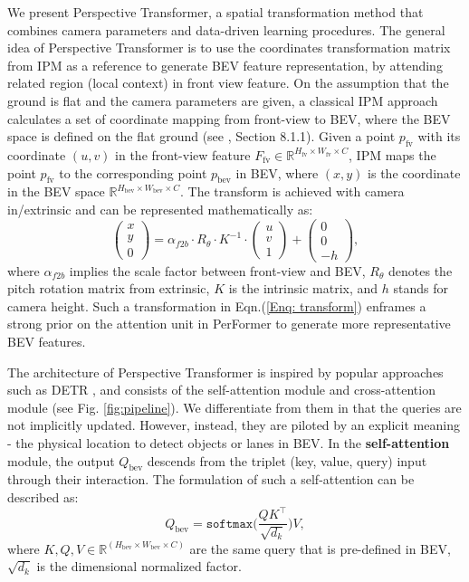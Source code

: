 \documentclass[runningheads]{llncs}
\begin{document}
We present Perspective Transformer, a spatial transformation method that combines camera parameters and data-driven learning procedures.
The general idea of Perspective Transformer is
{to use the coordinates transformation matrix from IPM as a reference to generate BEV feature representation},
by attending related region (local context) in front view feature.
On the assumption that the ground is flat and the camera 
parameters are given, a classical IPM approach calculates a set of coordinate mapping from front-view to BEV, where the BEV space is defined on the flat ground (see \cite{Hartley2004}, Section 8.1.1).
Given a point $p_{\text{fv}}$ with its coordinate $(u,v)$ in the front-view feature $F_{\text{fv}} \in \mathbb{R}^{H_{\text{fv}} \times W_{\text{fv}} \times C}$, IPM maps the point $p_{\text{fv}}$ to the corresponding point $p_{\text{bev}}$ in BEV, where $(x,y)$ is the coordinate in the BEV space $\mathbb{R}^{H_{\text{bev}} \times W_{\text{bev}} \times C}$. 
The transform is achieved with camera in/extrinsic and can be represented mathematically as:
\begin{equation}\begin{pmatrix}
    x \\
    y \\
    0
    \end{pmatrix} = \alpha_{f2b} \cdot R_{\theta} \cdot K^{-1} \cdot
    \begin{pmatrix}
    u \\
    v \\
    1
    \end{pmatrix} + 
    \begin{pmatrix}
    0 \\
    0 \\
    -h
    \end{pmatrix}, \label{Enq: transform}
\end{equation}
where $\alpha_{f2b}$ implies the scale factor between front-view and BEV, $R_{\theta}$ denotes the pitch rotation matrix from extrinsic, $K$ is the intrinsic matrix, and $h$ stands for camera height.
Such a transformation in Eqn.(\ref{Enq: transform}) enframes a strong prior 
on the attention unit in PerFormer to generate more representative BEV features.




The architecture of Perspective Transformer is inspired by popular approaches such as DETR \cite{carion2020end},  and consists of the self-attention module and cross-attention module (see Fig. \ref{fig:pipeline}).
We differentiate from them in that the queries are not implicitly updated. However, instead, they are piloted by an explicit meaning - the physical location to detect objects or lanes in BEV.
{In the \textbf{self-attention} module, the output $ Q_{\text{bev}} $ descends from the triplet (key, value, query) input through their interaction.}
The formulation of such a self-attention can be described as:
\begin{equation}
    Q_{\text{bev}} = \texttt{softmax} \bigg( \frac{QK^\top}{\sqrt{d_k}} \bigg) V,
\end{equation}
where $K,Q,V \in \mathbb{R}^{(H_{\text{bev}} \times W_{\text{bev}} \times C)}$ are the same query that is pre-defined in BEV, $\sqrt{d_k}$ is the dimensional normalized factor.
\end{document}

